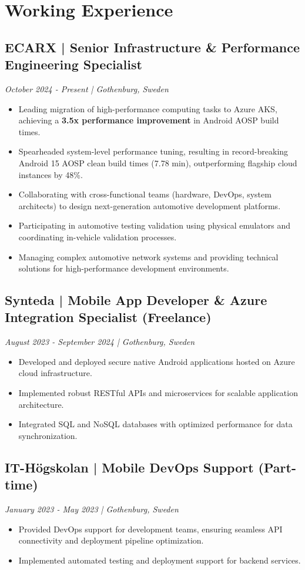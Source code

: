 \documentclass[11pt,a4paper]{article}
\begin{document}
\section*{Working Experience}
\subsection*{ECARX | Senior Infrastructure \& Performance Engineering Specialist}
\textit{October 2024 - Present | Gothenburg, Sweden}
\begin{itemize}[noitemsep]
\item Leading migration of high-performance computing tasks to Azure AKS, achieving a \textbf{3.5x performance improvement} in Android AOSP build times.
\item Spearheaded system-level performance tuning, resulting in record-breaking Android 15 AOSP clean build times (7.78 min), outperforming flagship cloud instances by 48\%.
\item Collaborating with cross-functional teams (hardware, DevOps, system architects) to design next-generation automotive development platforms.
\item Participating in automotive testing validation using physical emulators and coordinating in-vehicle validation processes.
\item Managing complex automotive network systems and providing technical solutions for high-performance development environments.
\end{itemize}

\subsection*{Synteda | Mobile App Developer \& Azure Integration Specialist (Freelance)}
\textit{August 2023 - September 2024 | Gothenburg, Sweden}
\begin{itemize}[noitemsep]
\item Developed and deployed secure native Android applications hosted on Azure cloud infrastructure.
\item Implemented robust RESTful APIs and microservices for scalable application architecture.
\item Integrated SQL and NoSQL databases with optimized performance for data synchronization.
\end{itemize}

\subsection*{IT-Högskolan | Mobile DevOps Support (Part-time)}
\textit{January 2023 - May 2023 | Gothenburg, Sweden}
\begin{itemize}[noitemsep]
\item Provided DevOps support for development teams, ensuring seamless API connectivity and deployment pipeline optimization.
\item Implemented automated testing and deployment support for backend services.
\end{itemize}
\end{document}
